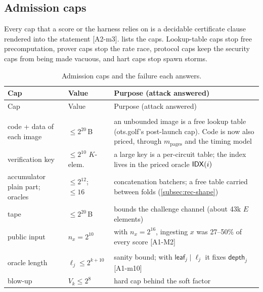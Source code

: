 \subsection{Admission caps}\label{subsec:cost-caps}

Every cap that a score or the harness relies on is a decidable certificate clause rendered into the
statement [A2-m3].  lists the caps. Lookup-table caps stop free precomputation,
prover caps stop the rate race, protocol caps keep the security caps from being made vacuous, and
hart caps stop spawn storms.

\begingroup\small
\renewcommand{\arraystretch}{1.1}
\begin{longtable}{@{}>{\raggedright\arraybackslash}p{}>{\raggedright\arraybackslash}p{}>{\raggedright\arraybackslash}p{}@{}}
\caption{Admission caps and the failure each answers.}\label{tab:cost-caps}\\
\toprule
Cap & Value & Purpose (attack answered) \\
\midrule
\endfirsthead
\toprule
Cap & Value & Purpose (attack answered) \\
\midrule
\endhead
\multicolumn{3}{@{}l}{\emph{Lookup-table caps}}\\
code + data of each image & $\le2^{20}$\,B & an unbounded image is a free lookup table (ots.golf's post-launch cap). Code is now also priced, through $m_{\mathrm{pages}}$ and the timing model \\
verification key & $\le2^{10}$ $K$-elem. & a large key is a per-circuit table; the index lives in the priced oracle $\mathsf{IDX}(i)$ \\
accumulator plain part; oracles & $\le2^{12}$; $\le16$ & concatenation batchers; a free table carried between folds (\cref{subsec:rec-shape}) \\
tape & $\le2^{20}$\,B & bounds the challenge channel (about 43k $E$ elements) \\
public input & $n_x=2^{10}$ & with $n_x=2^{16}$, ingesting $x$ was 27--50\% of every score [A1-M2] \\
\multicolumn{3}{@{}l}{\emph{Prover-cost caps}}\\
oracle length & $\ell_j\le2^{k+10}$ & sanity bound; with $\mathsf{leaf}_j\mid\ell_j$ it fixes $\mathsf{depth}_j$ [A1-m10] \\
blow-up & $V_k\le2^8$ & hard cap behind the soft factor \\

\end{longtable}

